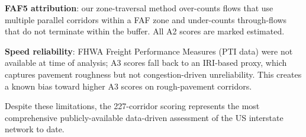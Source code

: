 \textbf{FAF5 attribution}: our zone-traversal method over-counts flows that use multiple parallel corridors within a FAF zone and under-counts through-flows that do not terminate within the buffer. All A2 scores are marked estimated.

\textbf{Speed reliability}: FHWA Freight Performance Measures (PTI data) were not available at time of analysis; A3 scores fall back to an IRI-based proxy, which captures pavement roughness but not congestion-driven unreliability. This creates a known bias toward higher A3 scores on rough-pavement corridors.

Despite these limitations, the 227-corridor scoring represents the most comprehensive publicly-available data-driven assessment of the US interstate network to date.
